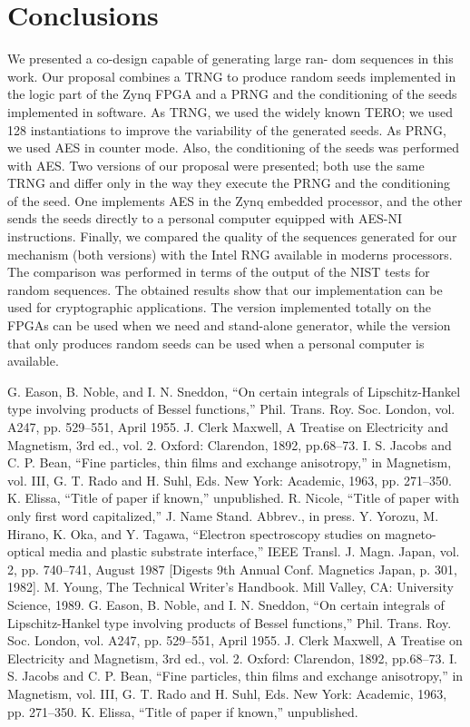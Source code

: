 \documentclass[journal]{IEEEtran}
\begin{document}
\section{Conclusions}

We presented a co-design capable of generating large ran- dom sequences in this work. Our proposal combines a TRNG to produce random seeds implemented in the logic part of the Zynq FPGA and a PRNG and the conditioning of the seeds implemented in software. As TRNG, we used the widely known TERO; we used 128 instantiations to improve the variability of the generated seeds. As PRNG, we used AES in counter mode. Also, the conditioning of the seeds was performed with AES. Two versions of our proposal were presented; both use the same TRNG and differ only in the way they execute the PRNG and the conditioning of the seed. One implements AES in the Zynq embedded processor, and the other sends the seeds directly to a personal computer equipped with AES-NI instructions. Finally, we compared the quality of the sequences generated for our mechanism (both versions) with the Intel RNG available in moderns processors. The comparison was performed in terms of the output of the NIST tests for random sequences. The obtained results show that our implementation can be used for cryptographic applications. The version implemented totally on the FPGAs can be used when we need and stand-alone generator, while the version that only produces random seeds can be used when a personal computer is available.


\begin{thebibliography}{00}
 G. Eason, B. Noble, and I. N. Sneddon, ``On certain integrals of Lipschitz-Hankel type involving products of Bessel functions,'' Phil. Trans. Roy. Soc. London, vol. A247, pp. 529--551, April 1955.
 J. Clerk Maxwell, A Treatise on Electricity and Magnetism, 3rd ed., vol. 2. Oxford: Clarendon, 1892, pp.68--73.
 I. S. Jacobs and C. P. Bean, ``Fine particles, thin films and exchange anisotropy,'' in Magnetism, vol. III, G. T. Rado and H. Suhl, Eds. New York: Academic, 1963, pp. 271--350.
 K. Elissa, ``Title of paper if known,'' unpublished.
 R. Nicole, ``Title of paper with only first word capitalized,'' J. Name Stand. Abbrev., in press.
 Y. Yorozu, M. Hirano, K. Oka, and Y. Tagawa, ``Electron spectroscopy studies on magneto-optical media and plastic substrate interface,'' IEEE Transl. J. Magn. Japan, vol. 2, pp. 740--741, August 1987 [Digests 9th Annual Conf. Magnetics Japan, p. 301, 1982].
 M. Young, The Technical Writer's Handbook. Mill Valley, CA: University Science, 1989.
 G. Eason, B. Noble, and I. N. Sneddon, ``On certain integrals of Lipschitz-Hankel type involving products of Bessel functions,'' Phil. Trans. Roy. Soc. London, vol. A247, pp. 529--551, April 1955.
 J. Clerk Maxwell, A Treatise on Electricity and Magnetism, 3rd ed., vol. 2. Oxford: Clarendon, 1892, pp.68--73.
 I. S. Jacobs and C. P. Bean, ``Fine particles, thin films and exchange anisotropy,'' in Magnetism, vol. III, G. T. Rado and H. Suhl, Eds. New York: Academic, 1963, pp. 271--350.
 K. Elissa, ``Title of paper if known,'' unpublished.
\end{thebibliography}
\end{document}
